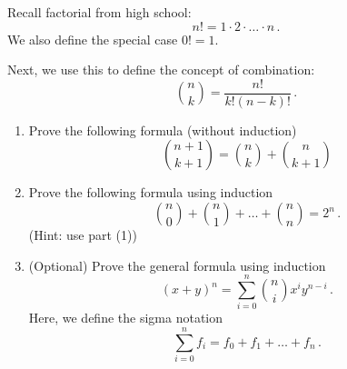 \documentclass[12pt]{amsart}
\begin{document}
\begin{problem}
    Recall factorial from high school:
    \begin{equation*}
        n! = 1\cdot 2\cdot \dots \cdot n \,.
    \end{equation*}
    We also define the special case $0! =1$.

    Next, we use this to define the concept of combination:
    \begin{equation*}
        {n \choose k }= \frac{n!}{k!(n-k)!} \,.
    \end{equation*}

    \begin{enumerate}
    \item Prove the following formula (without induction) 
            \begin{equation*}
                {n+ 1 \choose k+1 } = {n \choose k } + {n \choose k+1}
            \end{equation*}
        \item Prove the following formula using induction
            \begin{equation*}
                {n \choose 0} + {n \choose 1} + \dots + {n \choose n} = 2^n \,.
            \end{equation*}
            (Hint: use part (1))
        \item (Optional) Prove the general formula using induction
            \begin{equation*}
                (x+y)^n = \sum_{i=0}^n {n\choose i} x^i y^{n-i} \,.
            \end{equation*}
    Here, we define the sigma notation
    \begin{equation*}
        \sum_{i=0}^n f_i = f_0 + f_1 + \dots + f_n \,.
    \end{equation*}
    \end{enumerate}
\end{problem}




\printbibliography 
%
%
\end{document}
